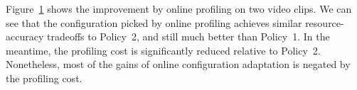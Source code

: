 Figure~\ref{fig:policy3} shows the improvement by online profiling 
on two video clips.
We can see that the configuration picked by online profiling achieves 
similar resource-accuracy tradeoffs to Policy~2, and still much better 
than Policy~1. 
In the meantime, the profiling cost is significantly reduced relative to
Policy~2. 
Nonetheless, most of the gains of online configuration adaptation is 
negated by the profiling cost.




\begin{figure}
    \centering
    \hspace{-0.5cm}
    \caption{}
    \label{fig:policy3}
\end{figure}

